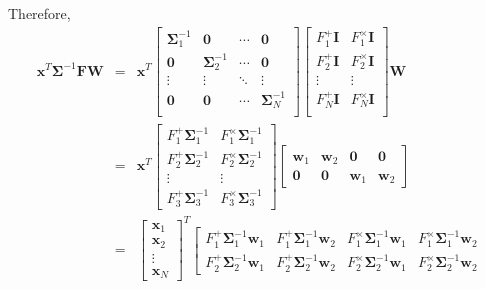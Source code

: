 \documentclass{article}
\begin{document}
Therefore,
\begin{eqnarray}
\mathbf{x}^T\mathbf{\Sigma}^{-1}\mathbf{FW}&=&
\mathbf{x}^T\left[
\begin{array}{cccc}
\mathbf{\Sigma}_1^{-1} & \mathbf{0} & \cdots & \mathbf{0} \\
\mathbf{0} & \mathbf{\Sigma}_2^{-1} & \cdots & \mathbf{0} \\
\vdots & \vdots & \ddots & \vdots \\
\mathbf{0} & \mathbf{0} & \cdots & \mathbf{\Sigma}_N^{-1} \\
\end{array}
\right]
\left[
\begin{array}{cc}
F_1^+\mathbf{I} & F_1^\times\mathbf{I} \\
F_2^+\mathbf{I} & F_2^\times\mathbf{I} \\
\vdots & \vdots \\
F_N^+\mathbf{I} & F_N^\times\mathbf{I} \\
\end{array}
\right]\mathbf{W}
\\
&=&
\mathbf{x}^T\left[
\begin{array}{cc}
F_1^+\mathbf{\Sigma}_1^{-1} & F_1^\times\mathbf{\Sigma}_1^{-1} \\
F_2^+\mathbf{\Sigma}_2^{-1} & F_2^\times\mathbf{\Sigma}_2^{-1} \\
\vdots & \vdots \\
F_3^+\mathbf{\Sigma}_3^{-1} & F_3^\times\mathbf{\Sigma}_3^{-1}
\end{array}
\right]\left[
\begin{array}{cccc}
\mathbf{w}_1 & \mathbf{w}_2 & \mathbf{0} & \mathbf{0} \\
\mathbf{0} & \mathbf{0} & \mathbf{w}_1 & \mathbf{w}_2
\end{array}
\right]\\
&=&
\left[
\begin{array}{c}
\mathbf{x}_1 \\
\mathbf{x}_2 \\
\vdots\\
\mathbf{x}_N
\end{array}
\right]^T
\left[
\begin{array}{cccc}
F_1^+\mathbf{\Sigma}_1^{-1}\mathbf{w}_1 & F_1^+\mathbf{\Sigma}_1^{-1}\mathbf{w}_2 & F_1^\times\mathbf{\Sigma}_1^{-1}\mathbf{w}_1 & F_1^\times\mathbf{\Sigma}_1^{-1}\mathbf{w}_2
\\
F_2^+\mathbf{\Sigma}_2^{-1}\mathbf{w}_1 & F_2^+\mathbf{\Sigma}_2^{-1}\mathbf{w}_2 & F_2^\times\mathbf{\Sigma}_2^{-1}\mathbf{w}_1 & F_2^\times\mathbf{\Sigma}_2^{-1}\mathbf{w}_2

\end{array}
\end{eqnarray}
\end{document}
